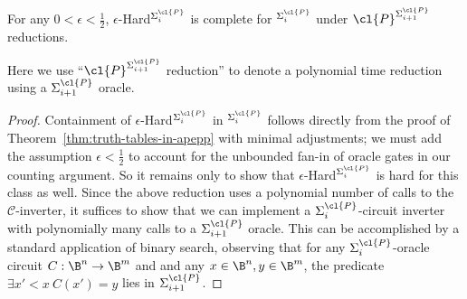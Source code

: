 \begin{theorem}
For any $0 < \epsilon < \frac{1}{2}$, {\sc $\epsilon$-Hard}$^{\Sigma^\cl{P}_i}$ is complete for $^{\Sigma^\cl{P}_i}$ under $\cl{P}^{\Sigma_{i+1}^\cl{P}}$ reductions.
\end{theorem}
Here we use ``$\cl{P}^{\Sigma_{i+1}^\cl{P}}$ reduction'' to denote a polynomial time reduction using a $\Sigma_{i+1}^\cl{P}$ oracle.
\begin{proof}
Containment of {\sc $\epsilon$-Hard}$^{\Sigma^\cl{P}_i}$ in $^{\Sigma^\cl{P}_i}$ follows directly from the proof of Theorem~\ref{thm:truth-tables-in-apepp} with minimal adjustments; we must add the assumption $\epsilon < \frac{1}{2}$ to account for the unbounded fan-in of oracle gates in our counting argument. So it remains only to show that {\sc $\epsilon$-Hard}$^{\Sigma^\cl{P}_i}$ is hard for this class as well. Since the above reduction uses a polynomial number of calls to the $\mathcal{C}$-inverter, it suffices to show that we can implement a $\Sigma^\cl{P}_i$-circuit inverter with polynomially many calls to a $\Sigma_{i+1}^\cl{P}$ oracle. This can be accomplished by a standard application of binary search, observing that for any $\Sigma^\cl{P}_i$-oracle circuit $C: \B^n \to \B^m$ and and any $x\in \B^n, y \in \B^m$, the predicate $\exists x'<x \: C(x')=y$ lies in $\Sigma^\cl{P}_{i+1}$.


\end{proof}
